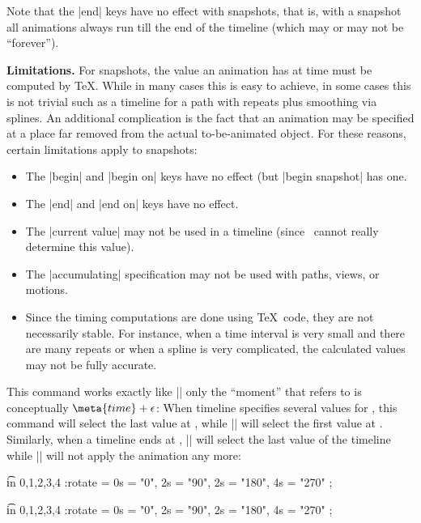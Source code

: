 \begin{command}{\pgfsnapshot{}}
    Note that the |end| keys have no effect with snapshots, that is, with a
    snapshot all animations always run till the end of the timeline (which may
    or may not be ``forever'').


    \medskip\textbf{Limitations.}
    For snapshots, the value an animation has at time  must be
    computed by \TeX. While in many cases this is easy to achieve, in some
    cases this is not trivial such as a timeline for a path with repeats plus
    smoothing via splines. An additional complication is the fact that an
    animation may be specified at a place far removed from the actual
    to-be-animated object. For these reasons, certain limitations apply to
    snapshots:
    \begin{itemize}
        \item The |begin| and |begin on| keys have no effect (but
            |begin snapshot| has one.
        \item The |end| and |end on| keys have no effect.
        \item The |current value| may not be used in a timeline (since
            \pgfname\ cannot really determine this value).
        \item The |accumulating| specification may not be used with paths,
            views, or motions.
        \item Since the timing computations are done using \TeX\ code, they are
            not necessarily stable. For instance, when a time interval is very
            small and there are many repeats or when a spline is very
            complicated, the calculated values may not be fully accurate.
    \end{itemize}
\end{command}

\begin{command}{\pgfsnapshotafter{}}
    This command works exactly like |\pgfsnapshot| only the ``moment'' that
     refers to is conceptually $\meta{time} + \epsilon$: When
    timeline specifies several values for , this command will select
    the last value at , while |\pgfsnapshot| will select the first
    value at . Similarly, when a timeline ends at ,
    |\pgfsnapshot| will select the last value of the timeline while
    |\pgfsnapshotafter| will not apply the animation any more:
\begin{codeexample}[preamble={\usepgfmodule{animations}}]
\foreach \t in {0,1,2,3,4} {
  \pgfsnapshot{\t}
  \tikz :rotate = { 0s = "0", 2s = "90", 2s = "180", 4s = "270" }
    ; }
\end{codeexample}
\begin{codeexample}[preamble={\usepgfmodule{animations}}]
\foreach \t in {0,1,2,3,4} {
  \pgfsnapshotafter{\t}
  \tikz :rotate = { 0s = "0", 2s = "90", 2s = "180", 4s = "270" }
    ; }
\end{codeexample}
\end{command}


